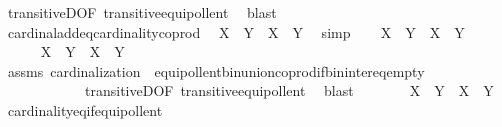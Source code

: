 \begin{isabellebody}
\ transitiveD{\isacharbrackleft}{\kern0pt}OF\ transitive{\isacharunderscore}{\kern0pt}equipollent{\isacharbrackright}{\kern0pt}\ \isamarkupfalse%
\ blast\isanewline
\ \ \isamarkupfalse%
\ cardinal{\isacharunderscore}{\kern0pt}add{\isacharunderscore}{\kern0pt}eq{\isacharunderscore}{\kern0pt}cardinality{\isacharunderscore}{\kern0pt}coprod\ \isamarkupfalse%
\ {\isachardoublequoteopen}{\isacharbar}{\kern0pt}X{\isacharbar}{\kern0pt}\ {\isasymoplus}\ {\isacharbar}{\kern0pt}Y{\isacharbar}{\kern0pt}\ {\isacharequal}{\kern0pt}\ {\isacharbar}{\kern0pt}{\isacharbar}{\kern0pt}X{\isacharbar}{\kern0pt}\ {\isasymCoprod}\ {\isacharbar}{\kern0pt}Y{\isacharbar}{\kern0pt}{\isacharbar}{\kern0pt}{\isachardoublequoteclose}\ \isamarkupfalse%
\ simp\isanewline
\ \ \isamarkupfalse%
\ {\isachardoublequoteopen}{\isacharbar}{\kern0pt}X\ {\isasymunion}\ Y{\isacharbar}{\kern0pt}\ {\isacharequal}{\kern0pt}\ {\isacharbar}{\kern0pt}X{\isacharbar}{\kern0pt}\ {\isasymoplus}\ {\isacharbar}{\kern0pt}Y{\isacharbar}{\kern0pt}{\isachardoublequoteclose}\isanewline
\ \ \isamarkupfalse%
\ {\isacharminus}{\kern0pt}\isanewline
\ \ \ \ \isamarkupfalse%
\ {\isachardoublequoteopen}X\ {\isasymunion}\ Y\ {\isasymapprox}\ {\isacharbar}{\kern0pt}X{\isacharbar}{\kern0pt}\ {\isasymCoprod}\ {\isacharbar}{\kern0pt}Y{\isacharbar}{\kern0pt}{\isachardoublequoteclose}\ \isanewline
\ \ \ \ \ \ \isamarkupfalse%
\ assms\ cardinalization\ \ equipollent{\isacharunderscore}{\kern0pt}bin{\isacharunderscore}{\kern0pt}union{\isacharunderscore}{\kern0pt}coprod{\isacharunderscore}{\kern0pt}if{\isacharunderscore}{\kern0pt}bin{\isacharunderscore}{\kern0pt}inter{\isacharunderscore}{\kern0pt}eq{\isacharunderscore}{\kern0pt}empty\ \isanewline
\ \ \ \ \ \ \ \ \ \ \ \ transitiveD{\isacharbrackleft}{\kern0pt}OF\ transitive{\isacharunderscore}{\kern0pt}equipollent{\isacharbrackright}{\kern0pt}\ \isamarkupfalse%
\ blast\isanewline
\ \ \ \ \isamarkupfalse%
\ \isamarkupfalse%
\ {\isachardoublequoteopen}{\isacharbar}{\kern0pt}X\ {\isasymunion}\ Y{\isacharbar}{\kern0pt}\ {\isacharequal}{\kern0pt}\ {\isacharbar}{\kern0pt}{\isacharbar}{\kern0pt}X{\isacharbar}{\kern0pt}\ {\isasymCoprod}\ {\isacharbar}{\kern0pt}Y{\isacharbar}{\kern0pt}{\isacharbar}{\kern0pt}{\isachardoublequoteclose}\ \isamarkupfalse%
\ cardinality{\isacharunderscore}{\kern0pt}eq{\isacharunderscore}{\kern0pt}if{\isacharunderscore}{\kern0pt}equipollent\ \isamarkupfalse%

\end{isabellebody}
